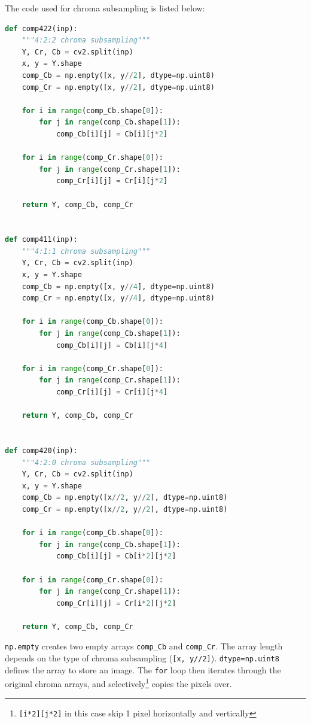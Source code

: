 \documentclass{article}
\begin{document}
The code used for chroma subsampling is listed below:
\begin{lstlisting}[language=Python]
def comp422(inp):
    """4:2:2 chroma subsampling"""
    Y, Cr, Cb = cv2.split(inp)
    x, y = Y.shape
    comp_Cb = np.empty([x, y//2], dtype=np.uint8)
    comp_Cr = np.empty([x, y//2], dtype=np.uint8)

    for i in range(comp_Cb.shape[0]):
        for j in range(comp_Cb.shape[1]):
            comp_Cb[i][j] = Cb[i][j*2]

    for i in range(comp_Cr.shape[0]):
        for j in range(comp_Cr.shape[1]):
            comp_Cr[i][j] = Cr[i][j*2]

    return Y, comp_Cb, comp_Cr


def comp411(inp):
    """4:1:1 chroma subsampling"""
    Y, Cr, Cb = cv2.split(inp)
    x, y = Y.shape
    comp_Cb = np.empty([x, y//4], dtype=np.uint8)
    comp_Cr = np.empty([x, y//4], dtype=np.uint8)

    for i in range(comp_Cb.shape[0]):
        for j in range(comp_Cb.shape[1]):
            comp_Cb[i][j] = Cb[i][j*4]

    for i in range(comp_Cr.shape[0]):
        for j in range(comp_Cr.shape[1]):
            comp_Cr[i][j] = Cr[i][j*4]

    return Y, comp_Cb, comp_Cr


def comp420(inp):
    """4:2:0 chroma subsampling"""
    Y, Cr, Cb = cv2.split(inp)
    x, y = Y.shape
    comp_Cb = np.empty([x//2, y//2], dtype=np.uint8)
    comp_Cr = np.empty([x//2, y//2], dtype=np.uint8)

    for i in range(comp_Cb.shape[0]):
        for j in range(comp_Cb.shape[1]):
            comp_Cb[i][j] = Cb[i*2][j*2]

    for i in range(comp_Cr.shape[0]):
        for j in range(comp_Cr.shape[1]):
            comp_Cr[i][j] = Cr[i*2][j*2]

    return Y, comp_Cb, comp_Cr
\end{lstlisting}

\texttt{np.empty} creates two empty arrays \texttt{comp\_Cb} and \texttt{comp\_Cr}.
The array length depends on the type of chroma subsampling (\texttt{[x, y//2]}).
\texttt{dtype=np.uint8} defines the array to store an image.
The \texttt{for} loop then iterates through the original chroma arrays, and selectively\footnote{\texttt{[i*2][j*2]} in this case skip 1 pixel horizontally and vertically} copies the pixels over.
\end{document}

